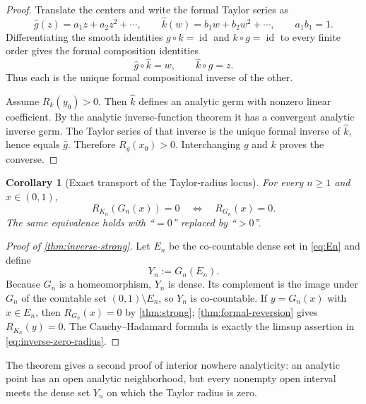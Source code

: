 \documentclass[11pt,oneside]{article}
\newtheorem{corollary}[theorem]{Corollary}
\theoremstyle{definition}
\theoremstyle{remark}
\newcommand{\id}{\operatorname{id}}
\newcommand{\comp}{\mathbin{\circ}}
\newcommand{\FormalTaylorGerm}[1]{\widehat{#1}}
\begin{document}
\begin{proof}
Translate the centers and write the formal Taylor series as
\[
 \FormalTaylorGerm{g}(z)=a_1z+a_2z^2+\cdots,
 \qquad
 \FormalTaylorGerm{k}(w)=b_1w+b_2w^2+\cdots,
 \qquad a_1b_1=1.
\]
Differentiating the smooth identities $g\comp k=\id$ and $k\comp g=\id$ to every
finite order gives the formal composition identities
\begin{equation}
 \FormalTaylorGerm{g}\comp\FormalTaylorGerm{k}=w,
 \qquad
 \FormalTaylorGerm{k}\comp\FormalTaylorGerm{g}=z.
 \label{eq:formal-inverse-identities}
\end{equation}
Thus each is the unique formal compositional inverse of the other.

Assume $R_k(y_0)>0$.  Then $\FormalTaylorGerm{k}$ defines an analytic germ with nonzero linear
coefficient.  By the analytic inverse-function theorem it has a convergent analytic
inverse germ.  The Taylor series of that inverse is the unique formal inverse of
$\FormalTaylorGerm{k}$, hence equals $\FormalTaylorGerm{g}$.  Therefore $R_g(x_0)>0$.  Interchanging $g$
and $k$ proves the converse.
\end{proof}

\begin{corollary}[Exact transport of the Taylor-radius locus]
\label{cor:radius-transport}
For every $n\geq1$ and $x\in(0,1)$,
\begin{equation}
 R_{K_n}(G_n(x))=0\quad\Longleftrightarrow\quad R_{G_n}(x)=0.
 \label{eq:radius-transport}
\end{equation}
The same equivalence holds with ``$=0$'' replaced by ``$>0$''.
\end{corollary}

\begin{proof}[Proof of \cref{thm:inverse-strong}]
Let $E_n$ be the co-countable dense set in \eqref{eq:En} and define
\begin{equation}
 Y_n:=G_n(E_n).
 \label{eq:Yn}
\end{equation}
Because $G_n$ is a homeomorphism, $Y_n$ is dense.  Its complement is the image under
$G_n$ of the countable set $(0,1)\setminus E_n$, so $Y_n$ is co-countable.  If
$y=G_n(x)$ with $x\in E_n$, then $R_{G_n}(x)=0$ by \cref{thm:strong};
\cref{thm:formal-reversion} gives $R_{K_n}(y)=0$.  The Cauchy--Hadamard formula is
exactly the limsup assertion in \eqref{eq:inverse-zero-radius}.
\end{proof}

The theorem gives a second proof of interior nowhere analyticity: an analytic point has
an open analytic neighborhood, but every nonempty open interval meets the dense set
$Y_n$ on which the Taylor radius is zero.
\end{document}
